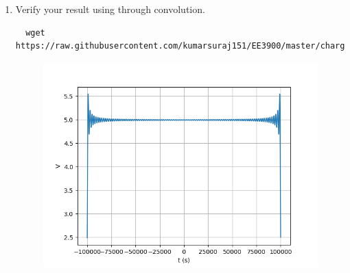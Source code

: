 \documentclass[journal,12pt,twocolumn]{IEEEtran}
\renewcommand\thesection{\arabic{section}}
\begin{document}
\begin{enumerate}[label=\thesection.\arabic*
,ref=\thesection.\theenumi]
\begin{align}
h(t)=\frac{2V_0\pi f_0}{A_0}\sinc{4f_0t}
\end{align}
\item Verify your result using  through convolution.
\solution 
\begin{lstlisting}
  wget https://raw.githubusercontent.com/kumarsuraj151/EE3900/master/charger/codes/1.1.py
\end{lstlisting}
\begin{figure}[!ht]
  \centering
  \includegraphics[width=\columnwidth]{./figs/4.3.png  }
  \caption{}
\end{figure}
\end{enumerate}
\end{document}
